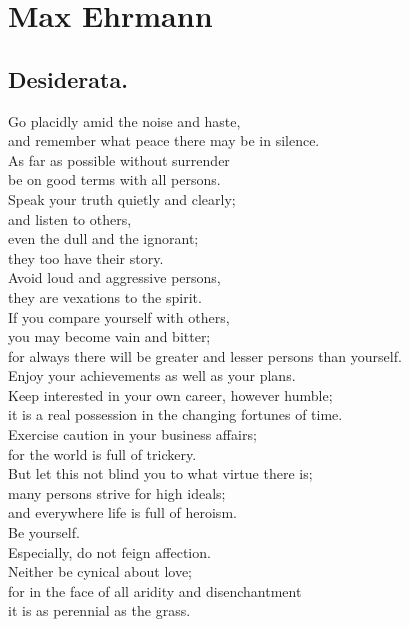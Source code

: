 \chapter{Max Ehrmann}
\section{Desiderata.}

Go placidly amid the noise and haste,\\
and remember what peace there may be in silence.\\
As far as possible without surrender\\
be on good terms with all persons.\\
Speak your truth quietly and clearly;\\
and listen to others,\\
even the dull and the ignorant;\\
they too have their story.\\

Avoid loud and aggressive persons,\\
they are vexations to the spirit.\\
If you compare yourself with others,\\
you may become vain and bitter;\\
for always there will be greater and lesser persons than yourself.\\
Enjoy your achievements as well as your plans.\\

Keep interested in your own career, however humble;\\
it is a real possession in the changing fortunes of time.\\
Exercise caution in your business affairs;\\
for the world is full of trickery.\\
But let this not blind you to what virtue there is;\\
many persons strive for high ideals;\\
and everywhere life is full of heroism.\\

Be yourself.\\
Especially, do not feign affection.\\
Neither be cynical about love;\\
for in the face of all aridity and disenchantment\\
it is as perennial as the grass.\\

